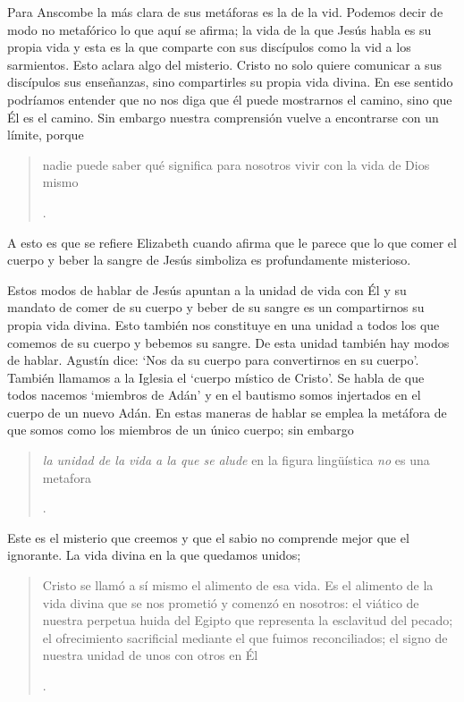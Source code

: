 Para Anscombe la más clara de sus metáforas es la de la vid. Podemos decir de modo no metafórico lo que aquí se afirma; la vida de la que Jesús habla es su propia vida y esta es la que comparte con sus discípulos como la vid a los sarmientos. Esto aclara algo del misterio. Cristo no solo quiere comunicar a sus discípulos sus enseñanzas, sino compartirles su propia vida divina. En ese sentido podríamos entender que no nos diga que él puede mostrarnos el camino, sino que Él es el camino. Sin embargo nuestra comprensión vuelve a encontrarse con un límite, porque \blockquote[{\Cite[93]{torralbaynubiola2005fayeh:ot}}.
]{nadie puede saber qué significa para nosotros vivir con la vida de Dios mismo}. A esto es que se refiere Elizabeth cuando afirma que le parece que lo que comer el cuerpo y beber la sangre de Jesús simboliza es profundamente misterioso.

Estos modos de hablar de Jesús apuntan a la unidad de vida con Él y su mandato de comer de su cuerpo y beber de su sangre es un compartirnos su propia vida divina. Esto también nos constituye en una unidad a todos los que comemos de su cuerpo y bebemos su sangre. De esta unidad también hay modos de hablar. Agustín dice: \enquote*{Nos da su cuerpo para convertirnos en su cuerpo}. También llamamos a la Iglesia el \enquote*{cuerpo místico de Cristo}. Se habla de que todos nacemos \enquote*{miembros de Adán} y en el bautismo somos injertados en el cuerpo de un nuevo Adán. En estas maneras de hablar se emplea la metáfora de que somos como los miembros de un único cuerpo; sin embargo \blockquote[{\Cite[94]{torralbaynubiola2005fayeh:ot}}.
]{\emph{la unidad de la vida a la que se alude} en la figura lingüística \emph{no} es una metafora}.

Este es el misterio que creemos y que el sabio no comprende mejor que el ignorante. La vida divina en la que quedamos unidos; \blockquote[{\Cite[94]{torralbaynubiola2005fayeh:ot}}.
]{Cristo se llamó a sí mismo el alimento de esa vida. Es el alimento de la vida divina que se nos prometió y comenzó en nosotros: el viático de nuestra perpetua huida del Egipto que representa la esclavitud del pecado; el ofrecimiento sacrificial mediante el que fuimos reconciliados; el signo de nuestra unidad de unos con otros en Él}.
